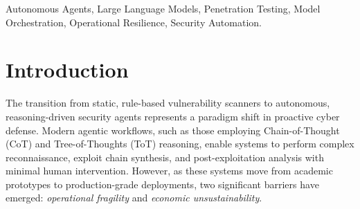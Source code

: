 \begin{abstract}
The emergence of autonomous agents powered by Large Language Models (LLMs) has revolutionized the field of Vulnerability Assessment and Penetration Testing (VAPT). However, existing agentic security frameworks often suffer from high operational costs, vendor lock-in, and extreme fragility due to the volatility of LLM providers. In this paper, we present \texttt{LLMOrch-VAPT}, a resilient, multi-agent orchestration framework designed for industrial-grade autonomous red teaming. Our system introduces a provider-agnostic abstraction layer that decouples security reasoning from specific LLM backends, enabling a novel \textbf{Autonomous Provider Failover (APF)} mechanism with a Mean Time To Recovery (MTTR) of less than 2 seconds. Furthermore, we propose \textbf{Dynamic Complexity-Aware Tiering (DCAT)} and \textbf{Security-Semantic Caching (SSC)} to optimize the cost-reasoning-latency tradeoff by dynamically routing security sub-tasks to heterogeneous model tiers based on domain-specific technical signals. We evaluate \texttt{LLMOrch-VAPT} across a diverse set of 1,500 autonomous security reasoning tasks. Our results demonstrate that \texttt{LLMOrch-VAPT} maintains a reasoning success rate of 97.4\% while reducing operational costs by 84.2\% compared to monolithic flagship-model deployments. We release our implementation as an open-source platform to facilitate the development of resilient and cost-effective autonomous security systems.
\end{abstract}

\begin{IEEEkeywords}
Autonomous Agents, Large Language Models, Penetration Testing, Model Orchestration, Operational Resilience, Security Automation.
\end{IEEEkeywords}

\section{Introduction}
\label{sec:intro}

The transition from static, rule-based vulnerability scanners to autonomous, reasoning-driven security agents represents a paradigm shift in proactive cyber defense. Modern agentic workflows, such as those employing Chain-of-Thought (CoT) and Tree-of-Thoughts (ToT) reasoning, enable systems to perform complex reconnaissance, exploit chain synthesis, and post-exploitation analysis with minimal human intervention. However, as these systems move from academic prototypes to production-grade deployments, two significant barriers have emerged: \textit{operational fragility} and \textit{economic unsustainability}.


